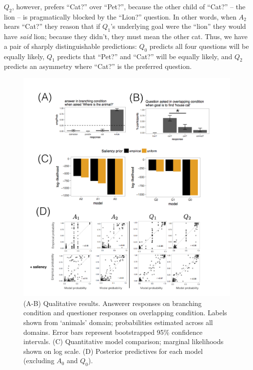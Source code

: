 \documentclass[12pt, floatsintext, jou]{apa6}
\begin{document}
$Q_2$, however, prefers ``Cat?'' over ``Pet?'', because the other child of ``Cat?'' -- the lion -- is pragmatically blocked by the ``Lion?'' question. In other words, when $A_2$ hears ``Cat?'' they reason that if $Q_1$'s underlying goal were the ``lion'' they would have \emph{said} lion; because they didn't, they must mean the other cat. Thus, we have a pair of sharply distinguishable predictions: $Q_0$ predicts all four questions will be equally likely, $Q_1$ predicts that ``Pet?'' and ``Cat?'' will be equally likely, and $Q_2$ predicts an asymmetry where ``Cat?'' is the preferred question.

\begin{figure}[t!]
\begin{center}
\includegraphics[scale = .9]{ResultsFig.png}
\end{center}
\caption{(A-B) Qualitative results. Answerer responses on branching condition and questioner responses on overlapping condition. Labels shown from `animals' domain; probabilities estimated across all domains. Error bars represent bootstrapped 95\% confidence intervals. (C) Quantitative model comparison; marginal likelihoods shown on log scale. (D) Posterior predictives for each model (excluding $A_0$ and $Q_0$).}
\label{fig:results}
\end{figure}
%
\end{document}
